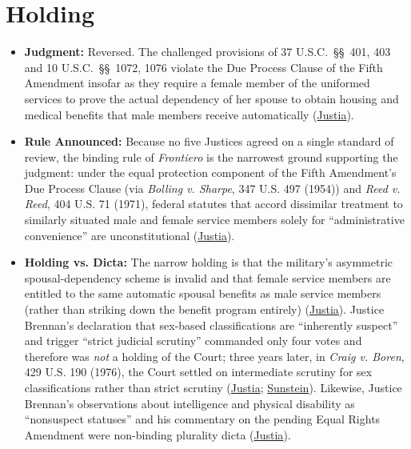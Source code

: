 \documentclass[12pt]{article}
\begin{document}
\section{Holding}
\begin{itemize}
    \item \textbf{Judgment:} Reversed. The challenged provisions of 37 U.S.C.~\S\S~401, 403 and 10 U.S.C.~\S\S~1072, 1076 violate the Due Process Clause of the Fifth Amendment insofar as they require a female member of the uniformed services to prove the actual dependency of her spouse to obtain housing and medical benefits that male members receive automatically (\href{https://supreme.justia.com/cases/federal/us/411/677/}{Justia}).
    \item \textbf{Rule Announced:} Because no five Justices agreed on a single standard of review, the binding rule of \textit{Frontiero} is the narrowest ground supporting the judgment: under the equal protection component of the Fifth Amendment's Due Process Clause (via \textit{Bolling v. Sharpe}, 347 U.S. 497 (1954)) and \textit{Reed v. Reed}, 404 U.S. 71 (1971), federal statutes that accord dissimilar treatment to similarly situated male and female service members solely for ``administrative convenience'' are unconstitutional (\href{https://supreme.justia.com/cases/federal/us/411/677/}{Justia}).
    \item \textbf{Holding vs. Dicta:} The narrow holding is that the military's asymmetric spousal-dependency scheme is invalid and that female service members are entitled to the same automatic spousal benefits as male service members (rather than striking down the benefit program entirely) (\href{https://supreme.justia.com/cases/federal/us/411/677/}{Justia}). Justice Brennan's declaration that sex-based classifications are ``inherently suspect'' and trigger ``strict judicial scrutiny'' commanded only four votes and therefore was \emph{not} a holding of the Court; three years later, in \textit{Craig v. Boren}, 429 U.S. 190 (1976), the Court settled on intermediate scrutiny for sex classifications rather than strict scrutiny (\href{https://supreme.justia.com/cases/federal/us/411/677/}{Justia}; \href{https://casssunstein.substack.com/p/the-sex-discrimination-cases-of-the}{Sunstein}). Likewise, Justice Brennan's observations about intelligence and physical disability as ``nonsuspect statuses'' and his commentary on the pending Equal Rights Amendment were non-binding plurality dicta (\href{https://supreme.justia.com/cases/federal/us/411/677/}{Justia}).
\end{itemize}
\end{document}
